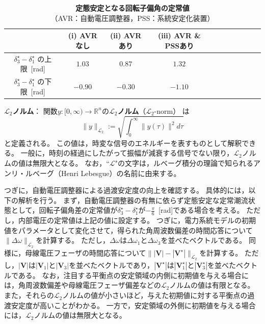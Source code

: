 \documentclass[tombow,dvipdfmx]{corona-a5-1.1}
\begin{document}
\begin{例}[自動電圧調整器による定態安定性と過渡安定度の変化]
\begin{table}[h]
\medskip
 \caption{\textbf{定態安定となる回転子偏角の定常値} 
 \\ \centering（AVR：自動電圧調整器，PSS：系統安定化装置）}
 \label{table:stableeqs}
 \centering
  \begin{tabular}{ccccccccccc}
   \hline
 & (i) AVRなし & (ii) AVRあり & (iii) AVR \& PSSあり \\
   \hline \hline
 $\delta_3^{\star}-\delta_1^{\star}$ の上限~[rad]  & $1.03$ & $0.87$ & $1.32$ \\
 $\delta_3^{\star}-\delta_1^{\star}$ の下限~[rad] & $-0.90$ & $-0.30$ & $-1.10$  \\
   \hline
  \end{tabular}
\end{table}

\begin{COLUMN}
\noindent \textbf{$\mathcal{L}_2$ノルム}：
関数$y:[0,\infty) \rightarrow \mathbb{R}^n$の\textbf{$\mathcal{L}_2$ノルム}（$\mathcal{L}_2$-norm）
は
\[
\|y\|_{\mathcal{L}_2} := \sqrt{
\int^{\infty}_{0}
\| y(\tau)\|^2  d \tau
}
\]
と定義される。
この値は，時変な信号のエネルギーを表すものとして解釈できる。
一般に，時刻の経過にしたがって振幅が減衰する信号でない限り，$\mathcal{L}_2$ノルムの値は無限大となる。
なお，``$\mathcal{L}$"の文字は，ルベーグ積分の理論で知られるアンリ・ルベーグ（Henri Lebesgue）の名前に由来する。
\end{COLUMN}



つぎに，自動電圧調整器による過渡安定度の向上を確認する。
具体的には，以下の解析を行う。
まず，自動電圧調整器の有無に依らず定態安定な定常潮流状態として，回転子偏角差の定常値が$\delta_3^{\star}-\delta_1^{\star}$が$-\tfrac{\pi}{6}$~[rad]である場合を考える。
ただし，内部電圧の定常値は上記の値に設定する。
つぎに，電力系統モデルの初期値をパラメータとして変化させて，得られた角周波数偏差の時間応答について$\|\Delta\omega\|_{\mathcal{L}_2}$を計算する。
ただし，$\Delta \omega$は$\Delta \omega_1$と$\Delta \omega_3$を並べたベクトルである。
同様に，母線電圧フェーザの時間応答について$\||\bm{V}|-|\bm{V}^{\star}| \|_{\mathcal{L}_2}$を計算する。
ただし，$|\bm{V}|$は$|\bm{V}_1|$と$|\bm{V}_3|$を並べたベクトルであり，$|\bm{V}^{\star}|$は$|\bm{V}_1^{\star}|$と$|\bm{V}_3^{\star}|$を並べたベクトルである。
なお，注目する平衡点の安定領域の内側に初期値を与える場合には，角周波数偏差や母線電圧フェーザ偏差などの$\mathcal{L}_2$ノルムの値は有限となる。
また，それらの$\mathcal{L}_2$ノルムの値が小さいほど，与えた初期値に対する平衡点の過渡安定度が高いことがわかる。
一方で，安定領域の外側に初期値を与える場合には，$\mathcal{L}_2$ノルムの値は無限大となる。



\end{例}
\end{document}
